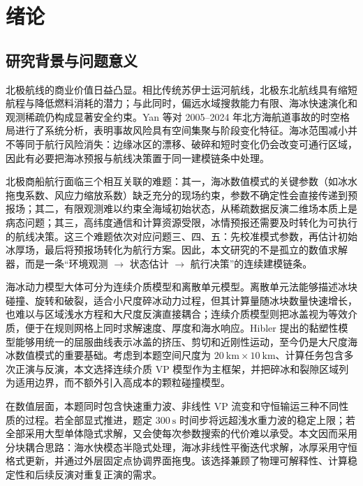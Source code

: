 \documentclass[UTF8]{ctexart}
\begin{document}
\pagestyle{plain}
\newpage
\linespread{1.25}\selectfont
\tableofcontents
\newpage

\section{绪论}

\subsection{研究背景与问题意义}

北极航线的商业价值日益凸显。相比传统苏伊士运河航线，北极东北航线具有缩短航程与降低燃料消耗的潜力；与此同时，偏远水域搜救能力有限、海冰快速演化和观测稀疏仍构成显著安全约束。Yan 等\cite{yan2026}对 2005--2024 年北方海航道事故的时空格局进行了系统分析，表明事故风险具有空间集聚与阶段变化特征。海冰范围减小并不等同于航行风险消失：边缘冰区的漂移、破碎和短时变化仍会改变可通行区域，因此有必要把海冰预报与航线决策置于同一建模链条中处理。

北极商船航行面临三个相互关联的难题：其一，海冰数值模式的关键参数（如冰水拖曳系数、风应力缩放系数）缺乏充分的现场约束，参数不确定性会直接传递到预报场；其二，有限观测难以约束全海域初始状态，从稀疏数据反演二维场本质上是病态问题；其三，高纬度通信和计算资源受限，冰情预报还需要及时转化为可执行的航线决策。这三个难题依次对应问题三、四、五：先校准模式参数，再估计初始冰厚场，最后将预报场转化为航行方案。因此，本文研究的不是孤立的数值求解器，而是一条“环境观测 $\to$ 状态估计 $\to$ 航行决策”的连续建模链条。

海冰动力模型大体可分为连续介质模型和离散单元模型。离散单元法能够描述冰块碰撞、旋转和破裂，适合小尺度碎冰动力过程，但其计算量随冰块数量快速增长，也难以与区域浅水方程和大尺度反演直接耦合；连续介质模型则把冰盖视为等效介质，便于在规则网格上同时求解速度、厚度和海水响应。Hibler 提出的黏塑性模型能够用统一的屈服曲线表示冰盖的挤压、剪切和近刚性运动，至今仍是大尺度海冰数值模式的重要基础\cite{hibler1979,feltham2008}。考虑到本题空间尺度为 $20\ \mathrm{km}\times10\ \mathrm{km}$、计算任务包含多次正演与反演，本文选择连续介质 VP 模型作为主框架，并把碎冰和裂隙区域列为适用边界，而不额外引入高成本的颗粒碰撞模型。

在数值层面，本题同时包含快速重力波、非线性 VP 流变和守恒输运三种不同性质的过程。若全部显式推进，题定 $300\ \mathrm s$ 时间步将远超浅水重力波的稳定上限；若全部采用大型单体隐式求解，又会使每次参数搜索的代价难以承受。本文因而采用分块耦合思路：海水快模态半隐式处理，海冰非线性平衡迭代求解，冰厚采用守恒格式更新，并通过外层固定点协调界面拖曳。该选择兼顾了物理可解释性、计算稳定性和后续反演对重复正演的需求。
\end{document}
